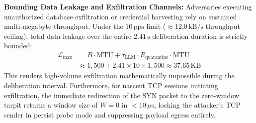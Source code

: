 \documentclass{ieeeaccess}
\renewcommand{\_}{\textunderscore\allowbreak}
\begin{document}
\textbf{Bounding Data Leakage and Exfiltration Channels:}
Adversaries executing unauthorized database exfiltration or credential harvesting rely on sustained multi-megabyte throughput. Under the $10\,\text{pps}$ limit ($\approx 12.0\,\text{kB/s}$ throughput ceiling), total data leakage over the entire $2.41\,\text{s}$ deliberation duration is strictly bounded:
\begin{equation}
\begin{split}
  \mathcal{L}_{\text{max}} &= B \cdot \text{MTU} + \tau_{\text{LLM}} \cdot R_{\text{quarantine}} \cdot \text{MTU} \\
  &\approx 1{,}500 + 2.41 \times 10 \times 1{,}500 \approx 37.65\,\text{KB}
\end{split}
\label{eq:leakage_bound}
\end{equation}
This renders high-volume exfiltration mathematically impossible during the deliberation interval. Furthermore, for nascent TCP sessions initiating exfiltration, the immediate redirection of the SYN packet to the zero-window tarpit returns a window size of $W=0$ in $< 10\,\mu\text{s}$, locking the attacker's TCP sender in persist probe mode and suppressing payload egress entirely.
\end{document}
